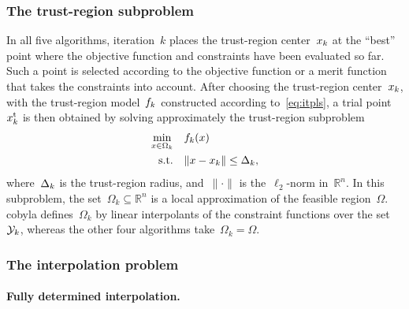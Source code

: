 \documentclass[
    smallextended,  %
    final,        %
]{svjour3}
\newcommand{\R}{\mathbb{R}}
\newcommand{\fsetm}[1][k]{\Omega_{#1}}
\newcommand{\fset}{\Omega}
\newcommand{\iter}[1][k]{x\ifthenelse{\equal{#1}{}}{}{_{#1}}}
\newcommand{\norm}[2][]{#1\lVert#2#1\rVert}
\newcommand{\objm}[1][k]{\obj\ifthenelse{\equal{#1}{}}{}{_{#1}}}
\newcommand{\obj}{f}
\newcommand{\rad}[1][k]{\Delta\ifthenelse{\equal{#1}{}}{}{_{#1}}}
\newcommand{\st}{\text{s.t.}}
\newcommand{\trust}{{\text{t}}}
\newcommand{\xpt}[1][k]{\mathcal{Y}\ifthenelse{\equal{#1}{}}{}{_{#1}}}
\begin{document}
\subsubsection{The trust-region subproblem}

In all five algorithms, iteration~$k$ places the trust-region center~$\iter$ at the ``best'' point where the objective function and constraints have been evaluated so far.
Such a point is selected according to the objective function or a merit function that takes the constraints into account.
After choosing the trust-region center~$\iter$, with the trust-region model~$\objm$ constructed
according to~\eqref{eq:itpls}, a trial point~$\iter^{\trust}$ is then obtained by solving approximately the trust-region subproblem
\begin{equation}
    \label{eq:trsp}
    \begin{split}
        \min_{x \in \fsetm} & \quad \objm(x)\\
        \st                 & \quad \norm{x - \iter} \le \rad,
    \end{split}
\end{equation}
where~$\rad$ is the trust-region radius, and~$\norm{\cdot}$ is the~$\ell_2$-norm in~$\R^n$.
In this subproblem, the set~$\fsetm \subseteq \R^n$ is a local approximation of the feasible region~$\fset$.
\Gls{cobyla} defines~$\fsetm$ by linear interpolants of the constraint functions over the set~$\xpt$,
whereas the other four algorithms take~$\fsetm = \fset$.


\subsubsection{The interpolation problem}
\label{ssec:iptprob}

\paragraph{\textnormal{\textbf{Fully determined interpolation.}}}
\end{document}
